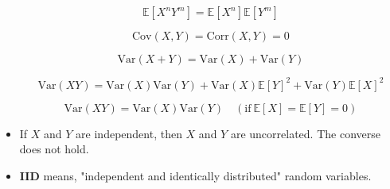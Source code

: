 \documentclass{report}
\begin{document}
\begin{concept}
\begin{itemize}
        $$
        \mathbb{E}[X^n Y^m] = \mathbb{E}[X^n] \mathbb{E}[Y^m]
        $$

        $$
        \text{Cov}(X, Y) = \text{Corr}(X, Y) = 0
        $$

        $$
        \text{Var}(X+Y) = \text{Var}(X) + \text{Var}(Y)
        $$

        $$
        \text{Var}(XY) = \text{Var}(X)\text{Var}(Y) + \text{Var}(X)\mathbb{E}[Y]^2 + \text{Var}(Y)\mathbb{E}[X]^2
        $$

        $$
        \text{Var}(XY) = \text{Var}(X)\text{Var}(Y) \quad (\text{if} \ \mathbb{E}[X]=\mathbb{E}[Y]=0)
        $$
        \item If $X$ and $Y$ are independent, then $X$ and $Y$ are uncorrelated. The converse does not hold.
        \item \textbf{IID} means, "independent and identically distributed" random variables.
    \end{itemize}
\end{concept}
\end{document}
